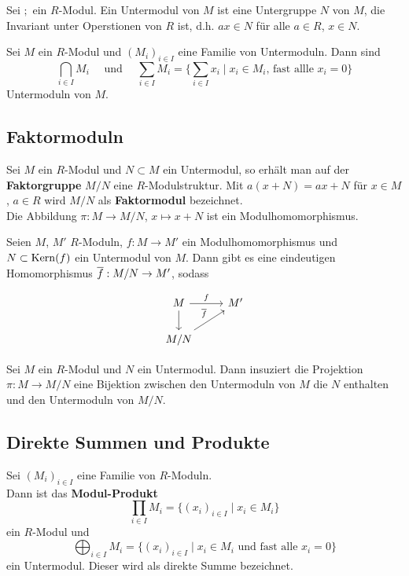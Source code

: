 	\begin{definition}
		Sei $;$ ein $R$-Modul. Ein Untermodul von $M$ ist eine Untergruppe $N$ von $M$, die Invariant unter Operstionen von $R$ ist, d.h. $ax\in N$ für alle $a\in R$, $x\in N$.
	\end{definition}

	\begin{exm}
		Sei $M$ ein $R$-Modul und $(M_i)_{i\in I}$ eine Familie von Untermoduln. Dann sind
		\[\bigcap_{i\in I}M_i\quad\text{ und }\quad \sum_{i\in I}M_i=\{\sum_{i\in I}x_i\mid x_i\in M_i\text{, fast allle $x_i=0$}\}\]
		Untermoduln von $M$.
	\end{exm}
	
	\subsection{Faktormoduln}
	\begin{definition}
		Sei $M$ ein $R$-Modul und $N\subset M$ ein Untermodul, so erhält man auf der \textbf{Faktorgruppe} $M/N$ eine $R$-Modulstruktur. Mit $a(x+N)=ax+N$ für $x\in M$, $a\in R$ wird $M/N$ als \textbf{Faktormodul} bezeichnet.\\
		Die Abbildung $\pi:M\to M/N$, $x\mapsto x+N$ ist ein Modulhomomorphismus.
	\end{definition}

	\begin{theorem}
		Seien $M$, $M'$ $R$-Moduln, $f:M\to M'$ ein Modulhomomorphismus und $N\subset\operatorname{Kern}(f)$ ein Untermodul von $M$. Dann gibt es eine eindeutigen Homomorphismus $\overline{f}:M/N\to M'$, sodass
		\begin{figure}[h]
			\centering
			\[\begin{tikzcd}
				M\ar[r,"f"]\ar[d]& M'\\
				M/N\ar[ur,"\ol f"]&
			\end{tikzcd}\]
		\end{figure}
	\end{theorem}

	\begin{satz}
		Sei $M$ ein $R$-Modul und $N$ ein Untermodul. Dann insuziert die Projektion $\pi:M\to M/N$ eine Bijektion zwischen den Untermoduln von $M$ die $N$ enthalten und den Untermoduln von $M/N$.
	\end{satz}

	\subsection{Direkte Summen und Produkte}
	\begin{definition}
		Sei $(M_i)_{i\in I}$ eine Familie von $R$-Moduln. \\
		Dann ist das \textbf{Modul-Produkt}
		\[\prod_{i\in I}M_i=\{(x_i)_{i\in I}\mid x_i\in M_i\}\]
		ein $R$-Modul und
		\[\bigoplus_{i\in I}M_i=\{(x_i)_{i\in I}\mid x_i\in M_i\text{ und fast alle $x_i=0$}\}\]
		ein Untermodul. Dieser wird als direkte Summe bezeichnet.
	\end{definition}


